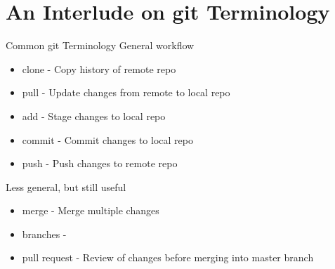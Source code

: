 \documentclass{beamer}
\begin{document}
    \section{An Interlude on git Terminology}
    \begin{frame}{Common git Terminology}
        General workflow
        \begin{itemize}
            \item clone - Copy history of remote repo
            \item pull - Update changes from remote to local repo
            \item add - Stage changes to local repo
            \item commit - Commit changes to local repo
            \item push - Push changes to remote repo
        \end{itemize}

        Less general, but still useful
        \begin{itemize}
            \item merge - Merge multiple changes
            \item branches -
            \item pull request - Review of changes before merging into master branch
        \end{itemize}
    \end{frame}
\end{document}
